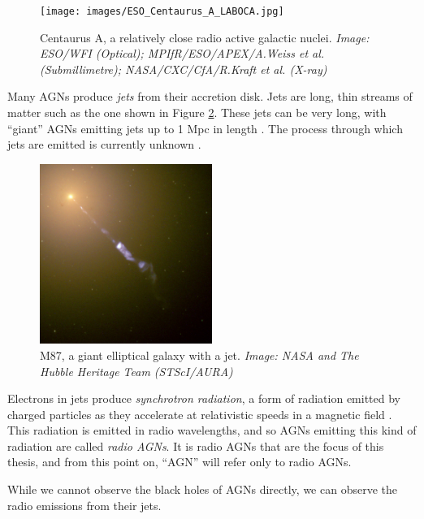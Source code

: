         \begin{figure}[!ht]
            \centering
            \texttt{[image: images/ESO\_Centaurus\_A\_LABOCA.jpg]}
            \caption{Centaurus A, a relatively close radio active galactic nuclei. \emph{Image: ESO/WFI (Optical); MPIfR/ESO/APEX/A.Weiss et al. (Submillimetre); NASA/CXC/CfA/R.Kraft et al. (X-ray)}}
            \label{fig:centaurus-a}
        \end{figure}

        Many AGNs produce \emph{jets} from their accretion disk. Jets are long, thin streams of matter such as the one shown in Figure \ref{fig:m87}. These jets can be very long, with ``giant'' AGNs emitting jets up to 1 Mpc in length . The process through which jets are emitted is currently unknown .

        \begin{figure}[!ht]
            \centering
            \includegraphics[width=0.5\textwidth]{images/M87_jet.jpg}
            \caption{M87, a giant elliptical galaxy with a jet. \emph{Image: NASA and The Hubble Heritage Team (STScI/AURA)}}
            \label{fig:m87}
        \end{figure}

        Electrons in jets produce \emph{synchrotron radiation}, a form of radiation emitted by charged particles as they accelerate at relativistic speeds in a magnetic field . This radiation is emitted in radio wavelengths, and so AGNs emitting this kind of radiation are called \emph{radio AGNs}. It is radio AGNs that are the focus of this thesis, and from this point on, ``AGN'' will refer only to radio AGNs.

        While we cannot observe the black holes of AGNs directly, we can observe the radio emissions from their jets. 

